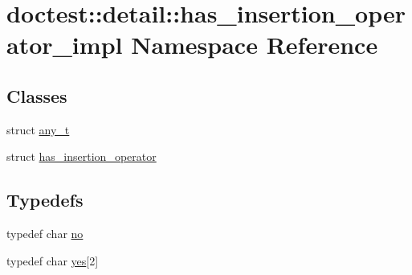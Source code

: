 \hypertarget{namespacedoctest_1_1detail_1_1has__insertion__operator__impl}{}\section{doctest\+:\+:detail\+:\+:has\+\_\+insertion\+\_\+operator\+\_\+impl Namespace Reference}
\label{namespacedoctest_1_1detail_1_1has__insertion__operator__impl}
\subsection*{Classes}
\begin{DoxyCompactItemize}
\item 
struct \hyperlink{structdoctest_1_1detail_1_1has__insertion__operator__impl_1_1any__t}{any\+\_\+t}
\item 
struct \hyperlink{structdoctest_1_1detail_1_1has__insertion__operator__impl_1_1has__insertion__operator}{has\+\_\+insertion\+\_\+operator}
\end{DoxyCompactItemize}
\subsection*{Typedefs}
\begin{DoxyCompactItemize}
\item 
typedef char \hyperlink{namespacedoctest_1_1detail_1_1has__insertion__operator__impl_a2abd7cf8c326904d6f21a4ef7bddb8e1}{no}
\item 
typedef char \hyperlink{namespacedoctest_1_1detail_1_1has__insertion__operator__impl_a0351593f27f12bf077fd702f6fc26fb5}{yes}\mbox{[}2\mbox{]}
\end{DoxyCompactItemize}

